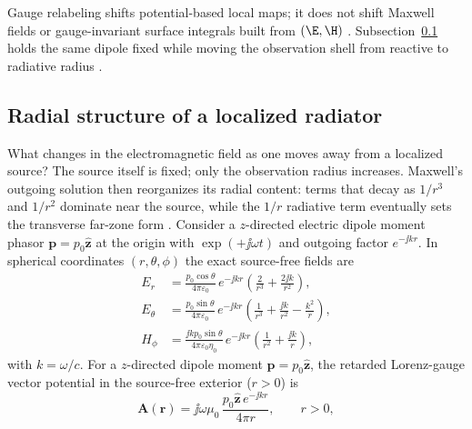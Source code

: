 Gauge relabeling shifts potential-based local maps; it does not shift Maxwell fields or gauge-invariant surface integrals built from \((\E,\H)\) \cite{maxwell1873,belinfante1940}. Subsection~\ref{sec:ch01.6.4} holds the same dipole fixed while moving the observation shell from reactive to radiative radius \cite{stratton1941,chu1948}.
\subsection{Radial structure of a localized radiator}
\label{sec:ch01.6.4}

What changes in the electromagnetic field as one moves away from a localized source? The source itself is fixed; only the observation radius increases. Maxwell's outgoing solution then reorganizes its radial content: terms that decay as $1/r^3$ and $1/r^2$ dominate near the source, while the $1/r$ radiative term eventually sets the transverse far-zone form \cite{stratton1941,poynting1884}. Consider a $z$-directed electric dipole moment phasor $\mathbf{p}=p_0\hat{\mathbf{z}}$ at the origin with $\exp(+\jj\omega t)$ and outgoing factor $e^{-\jj kr}$. In spherical coordinates $(r,\theta,\phi)$ the exact source-free fields are \cite{stratton1941,harrington2001}
\begin{subequations}
\label{eq:ch1.dipole-fields-explicit}
\begin{align}
E_r&=\frac{p_0\cos\theta}{4\pi\varepsilon_0}\,e^{-\jj kr}
\left(\frac{2}{r^3}+\frac{2\jj k}{r^2}\right),
\label{eq:ch1.dipole-Er}\\[0.25em]
E_\theta&=\frac{p_0\sin\theta}{4\pi\varepsilon_0}\,e^{-\jj kr}
\left(\frac{1}{r^3}+\frac{\jj k}{r^2}-\frac{k^2}{r}\right),
\label{eq:ch1.dipole-Etheta}\\[0.25em]
H_\phi&=\frac{\jj k p_0\sin\theta}{4\pi\varepsilon_0\eta_0}\,e^{-\jj kr}
\left(\frac{1}{r^2}+\frac{\jj k}{r}\right),
\label{eq:ch1.dipole-Hphi}
\end{align}
\end{subequations}
with $k=\omega/c$. For a $z$-directed dipole moment $\mathbf{p}=p_0\hat{\mathbf{z}}$, the retarded Lorenz-gauge vector potential in the source-free exterior ($r>0$) is
\begin{equation}
\label{eq:ch1.dipole-A-retarded}
\mathbf{A}(\mathbf{r})=\jj\omega\mu_0\,\frac{p_0\hat{\mathbf{z}}\,e^{-\jj kr}}{4\pi r},
\qquad r>0,
\end{equation}
